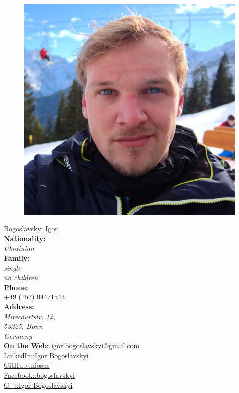 \documentclass[a4paper,12pt,final]{memoir}
\newcommand{\SmallSep}{\vspace{0.5em}}
\begin{document}
\begin{figure}
	\hfill
	\includegraphics[width=0.6\columnwidth]{photo.jpg}
	\vspace{-5cm}
\end{figure}

\begin{flushright}\small
	Bogoslavskyi Igor\\
	\textbf{Nationality:} \emph{\\Ukrainian\\}
	\textbf{Family:} \emph{\\single \\no children\\}
	\SmallSep
	\textbf{Phone:}\\
	+49 (152) 04471543\\
	\textbf{Address:}\\ \emph{Mirecourtstr. 12, \\53225, Bonn \\Germany}\\
	\SmallSep
	\textbf{On the Web:}
	\href{mailto:igor.bogoslavskyi@gmail.com}{igor.bogoslavskyi@gmail.com}\\
	\SmallSep
	\href{http://www.linkedin.com/pub/igor-bogoslavskyi/43/50b/726}{LinkedIn::Igor Bogoslavskyi}\\
	\SmallSep
	\href{https://github.com/niosus}{GitHub::niosus}\\
	\SmallSep
	\href{https://www.facebook.com/bogoslavskyi}{Facebook::bogoslavskyi}\\
	\SmallSep
	\href{https://plus.google.com/118159072920638602239/posts}{G+::Igor Bogoslavskyi}\\
	\SmallSep
\end{flushright}\normalsize
\framebreak
\end{document}
